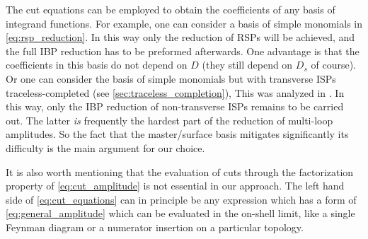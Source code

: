 The cut equations can be employed to obtain the coefficients of any basis of integrand functions. 
For example, one can consider a basis of simple monomials in \cref{eq:rsp_reduction}.
In this way only the reduction of RSPs will be achieved, and the full IBP reduction has to be preformed afterwards.
One advantage is that the coefficients in this basis do not depend on $D$ (they still depend on $D_s$ of course).
Or one can consider the basis of simple monomials but with transverse ISPs traceless-completed (see \cref{sec:traceless_completion}),
This was analyzed in \cite{Mastrolia:2016dhn}.
In this way, only the IBP reduction of non-transverse ISPs remains to be carried out.
The latter \textit{is} frequently the hardest part of the reduction of multi-loop amplitudes. 
So the fact that the master/surface basis mitigates significantly its difficulty is the main argument for our choice.

It is also worth mentioning that the evaluation of cuts through the 
factorization property of \cref{eq:cut_amplitude} is not essential in our approach. 
The left hand side of \cref{eq:cut_equations} can in principle be any 
expression which has a form of \cref{eq:general_amplitude} which can be evaluated in the on-shell limit,
like a single Feynman diagram or a numerator insertion on a particular topology. 



